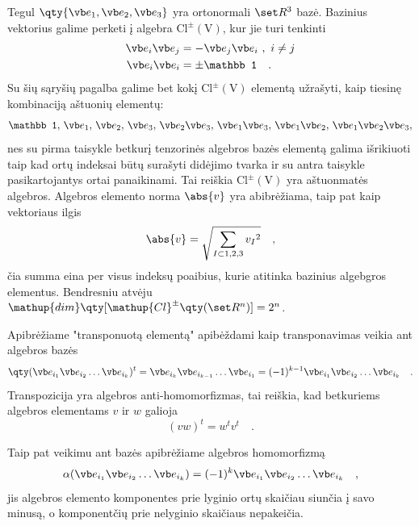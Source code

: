 Tegul $\qty{\vb e_1,\vb e_2,\vb e_3}$ yra ortonormali $\set R^3$ bazė. Bazinius vektorius galime perketi
į algebra $\mathup{Cl^\pm(V)}$, kur jie turi tenkinti
\begin{equation}
	\begin{split}
		\vb e_i \vb e_j &= - \vb e_j \vb e_i \ , \ i \neq j \\
		\vb e_i \vb e_i &= \pm \mathbb 1
		\quad .
	\end{split}
\end{equation}
Su šių sąryšių pagalba galime bet kokį $\mathup{Cl^\pm(V)}$ elementą užrašyti, kaip
tiesinę kombinaciją aštuonių elementų:
\begin{equation}
		\mathbb 1 ,\,
		\vb e_1 ,\, \vb e_2 ,\, \vb e_3 ,\, 
		\vb e_2 \vb e_3 ,\, \vb e_1 \vb e_3 ,\, \vb e_1 \vb e_2 ,\,
		\vb e_1 \vb e_2 \vb e_3 ,
\end{equation}
nes su pirma taisykle betkurį tenzorinės algebros bazės elementą galima išrikiuoti taip kad
ortų indeksai būtų surašyti didėjimo tvarka ir su antra taisykle pasikartojantys ortai panaikinami.
Tai reiškia $\mathup{Cl^\pm(V)}$ yra aštuonmatės algebros. Algebros elemento norma $\abs{v}$ yra
abibrėžiama, taip pat kaip vektoriaus ilgis
\begin{equation}
	\abs{v} = \sqrt{ \sum_{I \subset {1,2,3}} {v_I}^2 }
	\quad ,
\end{equation}
čia summa eina per visus indeksų poaibius, kurie atitinka bazinius algebgros elementus.
Bendresniu atvėju $\mathup{dim}\qty[\mathup{Cl}^\pm\qty(\set R^n)] = 2^n$.

Apibrėžiame "transponuotą elementą" apibėždami kaip transponavimas veikia ant algebros bazės
\begin{equation}
	\qty(\vb e_{i_1} \vb e_{i_2} \dots \vb e_{i_k} )^t
	=
	\vb e_{i_k} \vb e_{i_{k-1}} \dots \vb e_{i_1}
	=
	(-1)^{k-1} \vb e_{i_1} \vb e_{i_2} \dots \vb e_{i_k} 
	\quad .
\end{equation}
Transpozicija yra algebros anti-homomorfizmas, tai reiškia, kad betkuriems algebros elementams $v$ ir $w$ galioja
\begin{equation}
	(v w)^t = w^t v^t
	\quad .
\end{equation}


Taip pat veikimu ant bazės apibrėžiame algebros homomorfizmą
\begin{equation}
	\alpha( \vb e_{i_1} \vb e_{i_2} \dots \vb e_{i_k} )
	= 
	(-1)^{k} \vb e_{i_1} \vb e_{i_2} \dots \vb e_{i_k} 
	\quad ,
\end{equation}
jis algebros elemento komponentes prie lyginio ortų skaičiau siunčia į savo minusą, o
komponentčių prie nelyginio skaičiaus nepakeičia.











